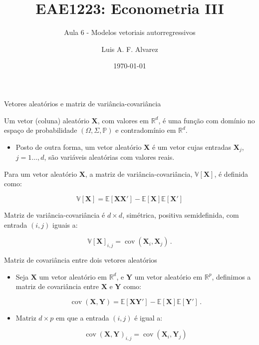 \documentclass[11pt]{beamer}
\author{Luis A. F. Alvarez}
\title{EAE1223: Econometria III}
\subtitle{Aula 6 - Modelos vetoriais autorregressivos}
\date{\today}
\newenvironment{halfwideitemize}{\itemize\addtolength{\itemsep}{0.5em}}{\enditemize}
\begin{document}
\begin{frame}[plain]
	\maketitle
\end{frame}

\begin{frame}{Vetores aleatórios e matriz de variância-covariância}
\begin{halfwideitemize}
	\item Um vetor (coluna) aleatório $\boldsymbol{X}$, com valores em $\mathbb{R}^d$, é uma função com domínio no espaço de probabilidade $(\Omega,\Sigma,\mathbb{P})$ e contradomínio em $\mathbb{R}^d$.
\begin{itemize}
	\item Posto de outra forma, um vetor aleatório  $\boldsymbol{X}$ é um vetor cujas entradas $\boldsymbol{X}_j$, $j=1\ldots, d$, são variáveis aleatórias com valores reais.
\end{itemize}
\item Para um vetor aleatório $\boldsymbol{X}$, a matriz de variância-covariância, $\mathbb{V}[\boldsymbol{X}]$, é definida como:

$$\mathbb{V}[\boldsymbol{X}]  = \mathbb{E}[\boldsymbol{X}\boldsymbol{X}'] - \mathbb{E}[\boldsymbol{X}]\mathbb{E}[\boldsymbol{X}']$$

\item Matriz de variância-covariância é $d \times d$, simétrica, positiva semidefinida, com entrada $(i,j)$ iguais a:

$$\mathbb{V}[\boldsymbol{X}]_{i,j}= \operatorname{cov}(\boldsymbol{X}_i,\boldsymbol{X}_j)\, .$$

\end{halfwideitemize}
\end{frame}

\begin{frame}{Matriz de covariância entre dois vetores aleatórios}
	\begin{itemize}
		\item Seja $\boldsymbol{X}$ um vetor aleatório em $\mathbb{R}^d$, e $\boldsymbol{Y}$ um vetor aleatório em $\mathbb{R}^p$, definimos a matriz de covariância entre $\boldsymbol{X}$ e $\boldsymbol{Y}$  como:
		
		$$\operatorname{cov}(\boldsymbol{X},\boldsymbol{Y}) = \mathbb{E}[\boldsymbol{X}\boldsymbol{Y}'] - \mathbb{E}[\boldsymbol{X}]\mathbb{E}[\boldsymbol{Y}'] \, .$$
		\item Matriz $d \times p$ em que a entrada $(i,j)$ é igual a:
		
		$$\operatorname{cov}(\boldsymbol{X},\boldsymbol{Y})_{i,j} = \operatorname{cov}(\boldsymbol{X}_i,\boldsymbol{Y}_j)$$
	\end{itemize}
\end{frame}
\end{document}
